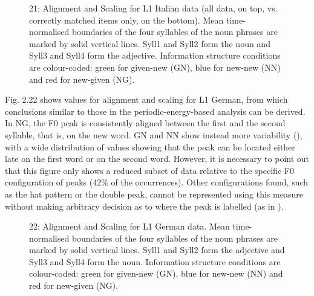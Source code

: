   
 

\begin{stylecaption}\begin{figure}
\caption{21: Alignment and Scaling for L1 Italian data (all data, on top, vs. correctly matched items only, on the bottom). Mean time-normalised boundaries of the four syllables of the noun phrases are marked by solid vertical lines. Syll1 and Syll2 form the noun and Syll3 and Syll4 form the adjective. Information structure conditions are colour-coded: green for given-new (GN), blue for new-new (NN) and red for new-given (NG).}
\label{fig:key:2}
\end{figure}\end{stylecaption}

Fig. 2.22 shows values for alignment and scaling for L1 German, from which conclusions similar to those in the periodic-energy-based analysis can be derived. In NG, the F0 peak is consistently aligned between the first and the second syllable, that is, on the new word. GN and NN show instead more variability (), with a wide distribution of values showing that the peak can be located either late on the first word or on the second word. However, it is necessary to point out that this figure only shows a reduced subset of data relative to the specific F0 configuration of peaks (42\% of the occurrences). Other configurations found, such as the hat pattern or the double peak, cannot be represented using this measure without making arbitrary decision as to where the peak is labelled (as in \citealt{Welby2004}).

  
 

\begin{stylecaption}\begin{figure}
\caption{22: Alignment and Scaling for L1 German data. Mean time-normalised boundaries of the four syllables of the noun phrases are marked by solid vertical lines. Syll1 and Syll2 form the adjective and Syll3 and Syll4 form the noun. Information structure conditions are colour-coded: green for given-new (GN), blue for new-new (NN) and red for new-given (NG).}
\label{fig:key:2}
\end{figure}\end{stylecaption}

